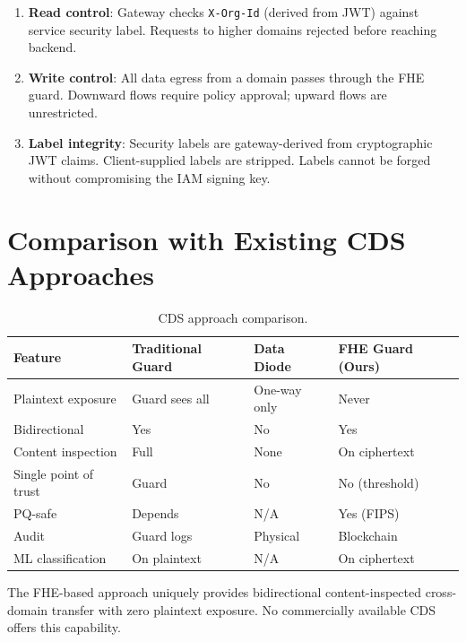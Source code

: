 \documentclass[11pt,letterpaper]{article}
\begin{document}
\begin{enumerate}
\item \textbf{Read control}: Gateway checks \texttt{X-Org-Id} (derived from JWT) against service security label. Requests to higher domains rejected before reaching backend.
\item \textbf{Write control}: All data egress from a domain passes through the FHE guard. Downward flows require policy approval; upward flows are unrestricted.
\item \textbf{Label integrity}: Security labels are gateway-derived from cryptographic JWT claims. Client-supplied labels are stripped. Labels cannot be forged without compromising the IAM signing key.
\end{enumerate}

\section{Comparison with Existing CDS Approaches}

\begin{table}[H]
\centering
\small
\begin{tabular}{@{}lp{2.5cm}p{2.5cm}p{2.5cm}@{}}
\toprule
\textbf{Feature} & \textbf{Traditional Guard} & \textbf{Data Diode} & \textbf{FHE Guard (Ours)} \\
\midrule
Plaintext exposure & Guard sees all & One-way only & Never \\
Bidirectional & Yes & No & Yes \\
Content inspection & Full & None & On ciphertext \\
Single point of trust & Guard & No & No (threshold) \\
PQ-safe & Depends & N/A & Yes (FIPS) \\
Audit & Guard logs & Physical & Blockchain \\
ML classification & On plaintext & N/A & On ciphertext \\
\bottomrule
\end{tabular}
\caption{CDS approach comparison.}
\label{tab:cds-comparison}
\end{table}

The FHE-based approach uniquely provides bidirectional content-inspected cross-domain transfer with zero plaintext exposure. No commercially available CDS offers this capability.
\end{document}
